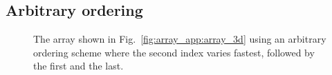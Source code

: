 \subsection{Arbitrary ordering}\label{sec:a_ordering}
\begin{figure}[tb]
\centering
\begin{minipage}{0.35\linewidth}
\centering
{}
\end{minipage}
\hfill
\begin{minipage}{0.4\linewidth}
\caption{{\small\label{fig:array_app:array_3d_aorder}
The array shown in Fig.~\ref{fig:array_app:array_3d} using an arbitrary ordering
scheme where the second index varies fastest, followed by the first and the
last.
}}
\end{minipage}
\end{figure}

